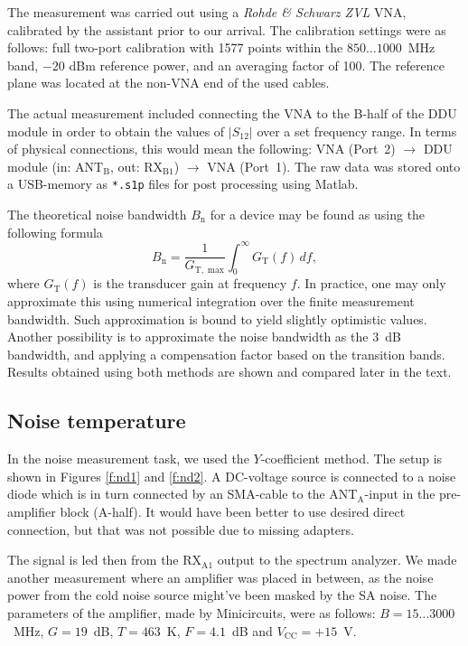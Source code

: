 \documentclass[a4paper, 12pt]{article}
\begin{document}
The measurement was carried out using a \textit{Rohde \& Schwarz ZVL} VNA, 
calibrated by the assistant prior to our arrival. The calibration settings were 
as follows: full two-port calibration with 1577 points within the $850 \ldots 1000$~MHz 
band, $-20$ dBm reference power, and an averaging factor of 100. The reference 
plane was located at the non-VNA end of the used cables.

The actual measurement included connecting the VNA to the B-half of the DDU module in 
order to obtain the values of $|S_{12}|$ over a set frequency range. In terms of physical 
connections, this would mean the following: VNA (Port~2) $\rightarrow$ DDU module 
(in: $\mathrm{ANT}_\mathrm{B}$, out: $\mathrm{RX}_\mathrm{B1}$) $\rightarrow$ VNA (Port~1). 
The raw data was stored onto a USB-memory as \texttt{*.s1p} files for post processing 
using Matlab.

The theoretical noise bandwidth $B_\mathrm{n}$ for a device may be found as using the 
following formula
\begin{equation}\label{e:Bn}
B_\mathrm{n} = \frac{1}{G_\mathrm{T,\;max}} \int_0^\infty G_\mathrm{T}(f) \, df,
\end{equation}
where $G_\mathrm{T}(f)$ is the transducer gain at frequency $f$. In practice, one may 
only approximate this using numerical integration over the finite measurement bandwidth. Such 
approximation is bound to yield slightly optimistic values. Another possibility is to 
approximate the noise bandwidth as the 3~dB bandwidth, and applying a compensation factor 
based on the transition bands. Results obtained using both methods are shown and compared 
later in the text.


\subsection{Noise temperature}

In the noise measurement task, we used the $Y$-coefficient method. The setup is shown 
in Figures \ref{f:nd1} and \ref{f:nd2}. A DC-voltage source is connected to a noise 
diode which is in turn connected by an SMA-cable to the $\mathrm{ANT}_\mathrm{A}$-input 
in the pre-amplifier block (A-half). It would have been better to use desired direct 
connection, but that was not possible due to missing adapters.

The signal is led then from the RX$_\mathrm{A1}$ output to the spectrum analyzer. We 
made another measurement where an amplifier was placed in between, as the noise power 
from the cold noise source might've been masked by the SA noise. The parameters of 
the amplifier, made by Minicircuits, were as follows: $B = 15 \ldots 3000$~MHz, 
$G = 19$~dB, $T = 463$~K, $F = 4.1$~dB and $V_\mathrm{CC} = +15$~V.
\end{document}
